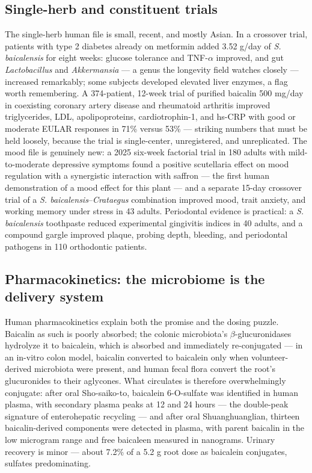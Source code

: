 \subsection{Single-herb and constituent trials}

The single-herb human file is small, recent, and mostly Asian. In a crossover trial, patients with type 2 diabetes already on metformin added 3.52 g/day of \textit{S. baicalensis} for eight weeks: glucose tolerance and TNF-$\alpha$ improved, and gut \textit{Lactobacillus} and \textit{Akkermansia} --- a genus the longevity field watches closely --- increased remarkably; some subjects developed elevated liver enzymes, a flag worth remembering. A 374-patient, 12-week trial of purified baicalin 500 mg/day in coexisting coronary artery disease and rheumatoid arthritis improved triglycerides, LDL, apolipoproteins, cardiotrophin-1, and hs-CRP with good or moderate EULAR responses in 71\% versus 53\% --- striking numbers that must be held loosely, because the trial is single-center, unregistered, and unreplicated. The mood file is genuinely new: a 2025 six-week factorial trial in 180 adults with mild-to-moderate depressive symptoms found a positive scutellaria effect on mood regulation with a synergistic interaction with saffron --- the first human demonstration of a mood effect for this plant --- and a separate 15-day crossover trial of a \textit{S. baicalensis}--\textit{Crataegus} combination improved mood, trait anxiety, and working memory under stress in 43 adults. Periodontal evidence is practical: a \textit{S. baicalensis} toothpaste reduced experimental gingivitis indices in 40 adults, and a compound gargle improved plaque, probing depth, bleeding, and periodontal pathogens in 110 orthodontic patients.

\subsection{Pharmacokinetics: the microbiome is the delivery system}

Human pharmacokinetics explain both the promise and the dosing puzzle. Baicalin as such is poorly absorbed; the colonic microbiota's $\beta$-glucuronidases hydrolyze it to baicalein, which is absorbed and immediately re-conjugated --- in an in-vitro colon model, baicalin converted to baicalein only when volunteer-derived microbiota were present, and human fecal flora convert the root's glucuronides to their aglycones. What circulates is therefore overwhelmingly conjugate: after oral Sho-saiko-to, baicalein 6-O-sulfate was identified in human plasma, with secondary plasma peaks at 12 and 24 hours --- the double-peak signature of enterohepatic recycling --- and after oral Shuanghuanglian, thirteen baicalin-derived components were detected in plasma, with parent baicalin in the low microgram range and free baicaleen measured in nanograms. Urinary recovery is minor --- about 7.2\% of a 5.2 g root dose as baicalein conjugates, sulfates predominating.


